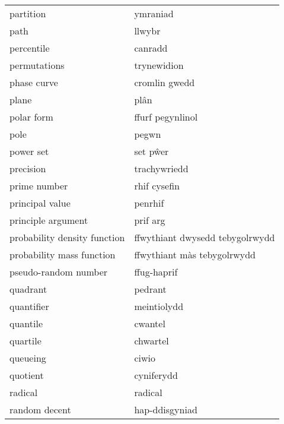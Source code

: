 \begin{supertabular}{p{0.22\textwidth}p{0.22\textwidth}}
                       partition &                        ymraniad \\
                            path &                          llwybr \\
                      percentile &                         canradd \\
                    permutations &                     trynewidion \\
                     phase curve &                   cromlin gwedd \\
                           plane &                            plân \\
                      polar form &                ffurf pegynlinol \\
                            pole &                           pegwn \\
                       power set &                        set pŵer \\
                       precision &                    trachywriedd \\
                    prime number &                    rhif cysefin \\
                 principal value &                         penrhif \\
              principle argument &                        prif arg \\
    probability density function & ffwythiant dwysedd tebygolrwydd \\
       probability mass function &     ffwythiant màs tebygolrwydd \\
            pseudo-random number &                     ffug-haprif \\
                        quadrant &                         pedrant \\
                      quantifier &                     meintiolydd \\
                        quantile &                         cwantel \\
                        quartile &                        chwartel \\
                        queueing &                           ciwio \\
                        quotient &                      cyniferydd \\
                         radical &                         radical \\
                   random decent &                  hap-ddisgyniad \\

\end{supertabular}
